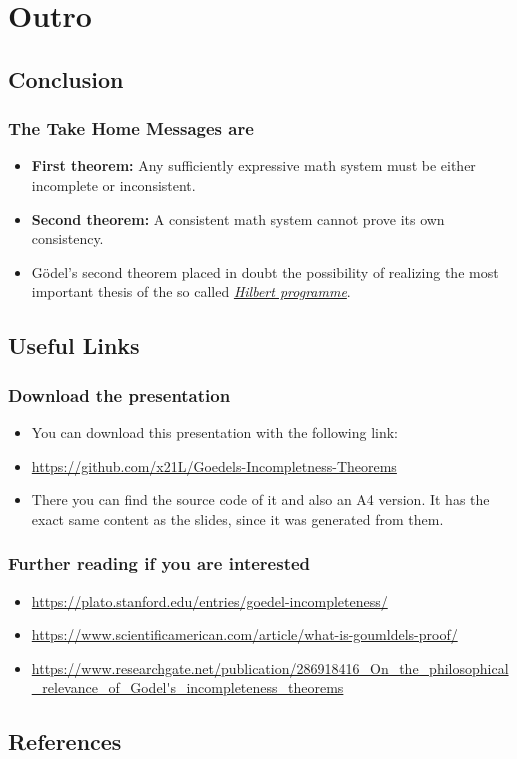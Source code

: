 \documentclass[aspectratio=169]{beamer}
\begin{document}
\section{Outro}
\subsection{Conclusion}
\begin{frame}
	\frametitle{The Take Home Messages are}
	\begin{itemize}
		\item \textbf{First theorem:} Any sufficiently expressive math system must be either incomplete or inconsistent.
		\item \textbf{Second theorem:} A consistent math system cannot prove its own consistency.
		\item Gödel's second theorem placed in doubt the possibility of realizing the most important thesis of the so called \href{https://en.wikipedia.org/wiki/Hilbert\%27s_problems}{\textit{Hilbert programme}}. \cite{bekl}
	\end{itemize}
\end{frame}

\subsection{Useful Links}

\begin{frame}
	\frametitle{Download the presentation}
	\begin{itemize}
		\item You can download this presentation with the following link:
		\item \url{https://github.com/x21L/Goedels-Incompletness-Theorems}
		\item There you can find the source code of it and also an A4 version. It has the exact same content as the slides, since it was generated from them.
	\end{itemize}
\end{frame}

\begin{frame}
	\frametitle{Further reading if you are interested}
	\begin{itemize}
		\item \url{https://plato.stanford.edu/entries/goedel-incompleteness/}
		\item \url{https://www.scientificamerican.com/article/what-is-goumldels-proof/}
		\item \url{https://www.researchgate.net/publication/286918416_On_the_philosophical_relevance_of_Godel's_incompleteness_theorems}
	\end{itemize}
\end{frame}

\subsection{References}
\begin{frame}
    
    
\end{frame}
\end{document}
